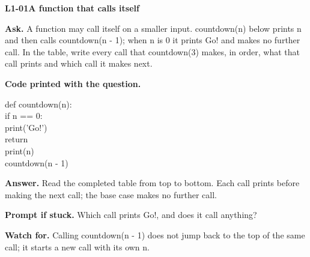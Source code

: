 \documentclass[11pt,a4paper]{article}
\begin{document}
\noindent\begin{minipage}{\textwidth}
{\color{teal}\textbf{L1-01}}\quad \textbf{A function that calls itself}\par\smallskip
\textbf{Ask.} A function may call itself on a smaller input. countdown(n) below prints n and then calls countdown(n - 1); when n is 0 it prints Go! and makes no further call. In the table, write every call that countdown(3) makes, in order, what that call prints and which call it makes next.\par\smallskip
{\small\textbf{Code printed with the question.}}\par\smallskip\noindent\colorbox{codepaper}{\parbox{\dimexpr\linewidth-2\fboxsep\relax}{\small\ttfamily\raggedright def countdown(n):\\\hspace*{2.4em}if n == 0:\\\hspace*{4.8em}print('Go!')\\\hspace*{4.8em}return\\\hspace*{2.4em}print(n)\\\hspace*{2.4em}countdown(n - 1)}}\par
\smallskip\textbf{Answer.} Read the completed table from top to bottom. Each call prints before making the next call; the base case makes no further call.\par\smallskip
\textbf{Prompt if stuck.} Which call prints Go!, and does it call anything?\par\smallskip
\textbf{Watch for.} Calling countdown(n - 1) does not jump back to the top of the same call; it starts a new call with its own n.
\end{minipage}\par{}\medskip
\end{document}
